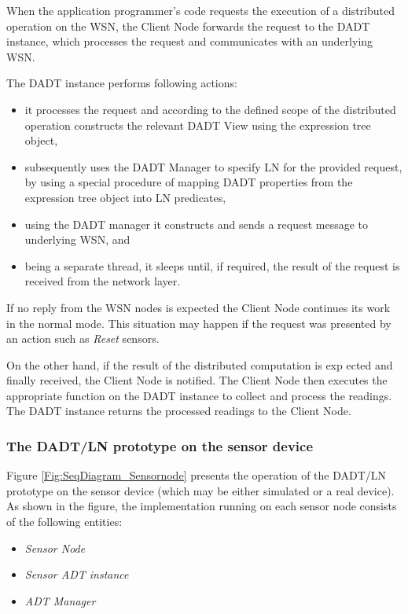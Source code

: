 When the application programmer's code requests the execution of a distributed operation
on the WSN, the Client Node forwards the request to the DADT instance, which
processes the request and communicates with an underlying WSN.

The DADT instance performs following actions:
  \begin{itemize} 
    \item it processes the request and according to the defined scope of the
    distributed operation constructs the relevant DADT View using the
    expression tree object,
    \item subsequently uses the DADT Manager to specify LN for the
    provided request, by using a special procedure of mapping DADT properties
    from the expression tree object into LN predicates,
    \item using the DADT manager it constructs and sends a request message to
    underlying WSN, and
    \item being a separate thread, it sleeps until, if required, the result of
    the request is received from the network layer.
  \end{itemize}
  
If no reply from the WSN nodes is expected the Client Node continues its work in
the normal mode. This situation may happen if the request was presented by an
action such as \emph{Reset} sensors. 
 
On the other hand, if the result of the distributed computation is exp ected and
finally received, the Client Node is notified. The Client Node then executes the
appropriate function on the DADT instance to collect and process the readings.
The DADT instance returns the processed readings to the Client Node.

\subsubsection{The DADT/LN prototype on the sensor device} \label{subsubsec:DADTLNSensorDevice}

Figure \ref{Fig:SeqDiagram_Sensornode} presents the operation of the DADT/LN
prototype on the sensor device (which may be either simulated or a real
device). As shown in the figure, the implementation running on each sensor node 
consists of the following entities:

\begin{itemize}
  \item \emph{Sensor Node} 
  \item \emph{Sensor ADT instance} 
  \item \emph{ADT Manager} 
\end{itemize}

